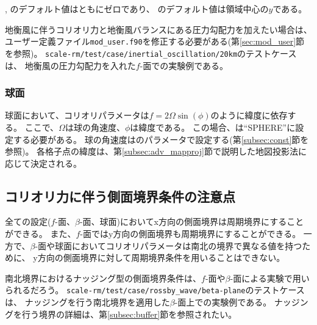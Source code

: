 , のデフォルト値はともにゼロであり、
のデフォルト値は領域中心の$y$である。

地衡風に伴うコリオリ力と地衡風バランスにある圧力勾配力を加えたい場合は、
ユーザー定義ファイル\verb|mod_user.f90|を修正する必要がある(第\ref{sec:mod_user}節を参照)。
\verb|scale-rm/test/case/inertial_oscillation/20km|のテストケースは、
地衡風の圧力勾配力を入れた$f$-面での実験例である。

\subsubsection{球面}
球面において、コリオリパラメータは$f = 2\Omega \sin(\phi)$のように緯度に依存する。
ここで、$\Omega$は球の角速度、$\phi$は緯度である。
この場合、は``SPHERE''に設定する必要がある。
球の角速度はのパラメータで設定する(第\ref{subsec:const}節を参照)。
各格子点の緯度は、第\ref{subsec:adv_mapproj}節で説明した地図投影法に応じて決定される。


\subsection{コリオリ力に伴う側面境界条件の注意点}

全ての設定($f$-面、$\beta$-面、球面)においてx方向の側面境界は周期境界にすることができる。
また、$f$-面ではy方向の側面境界も周期境界にすることができる。
一方で、$\beta$-面や球面においてコリオリパラメータは南北の境界で異なる値を持つために、
y方向の側面境界に対して周期境界条件を用いることはできない。

南北境界におけるナッジング型の側面境界条件は、$f$-面や$\beta$-面による実験で用いられるだろう。
\verb|scale-rm/test/case/rossby_wave/beta-plane|のテストケースは、
ナッジングを行う南北境界を適用した$\beta$-面上での実験例である。
ナッジングを行う境界の詳細は、第\ref{subsec:buffer}節を参照されたい。
